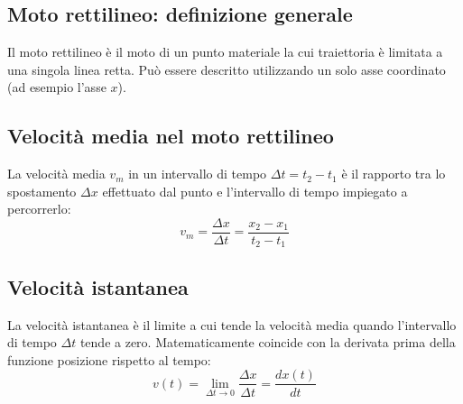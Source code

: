 \documentclass[12pt]{article}
\begin{document}
\vspace{0.5cm}
\begin{center}
\end{center}
\vspace{0.5cm}

\subsection*{Moto rettilineo: definizione generale}
Il moto rettilineo è il moto di un punto materiale la cui traiettoria è limitata a una singola linea retta. Può essere descritto utilizzando un solo asse coordinato (ad esempio l'asse $x$).

\subsection*{Velocità media nel moto rettilineo}
La velocità media $v_m$ in un intervallo di tempo $\Delta t = t_2 - t_1$ è il rapporto tra lo spostamento $\Delta x$ effettuato dal punto e l'intervallo di tempo impiegato a percorrerlo: %
\begin{equation}
v_m = \frac{\Delta x}{\Delta t} = \frac{x_2 - x_1}{t_2 - t_1}
\end{equation}

\subsection*{Velocità istantanea}
La velocità istantanea è il limite a cui tende la velocità media quando l'intervallo di tempo $\Delta t$ tende a zero. Matematicamente coincide con la derivata prima della funzione posizione rispetto al tempo: %
\begin{equation}
v(t) = \lim_{\Delta t \to 0} \frac{\Delta x}{\Delta t} = \frac{dx(t)}{dt} \tag{1.1}
\end{equation}
\end{document}
